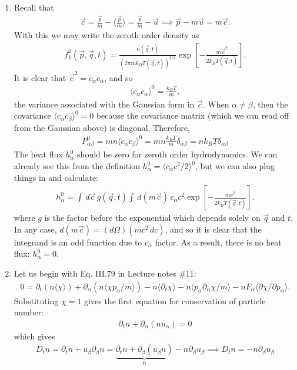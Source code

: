 \documentclass{article}
\theoremstyle{definition}
\newcommand{\p}{\partial}
\newcommand{\al}{\alpha}
\newcommand{\be}{\beta}
\newcommand{\f}[2]{\frac{#1}{#2}}
\newcommand{\lp}{\left(}
\newcommand{\rp}{\right)}
\newcommand{\lb}{\left[}
\newcommand{\rb}{\right]}
\begin{document}
\begin{enumerate}[label=(\alph*)]
	\item Recall that 
	\begin{align*}
	\vec{c} = \f{\vec{p}}{m} - \langle \f{\vec{p}}{m} \rangle = \f{\vec{p}}{m} - \vec{u} \implies \vec{p} - m\vec{u} = m\vec{c}.
	\end{align*}
	With this we may write the zeroth order density as 
	\begin{align*}
	f_1^0(\vec{p}, \vec{q}, t) = \f{n(\vec{q},t)}{(2\pi m k_BT (\vec{q},t))^{3/2}} \exp\lb -\f{m\vec{c}^2}{2k_BT(\vec{q},t)} \rb.
	\end{align*}
	It is clear that $\vec{c}^2 = c_\al c_\al$, and so 
	\begin{align*}
	\langle c_\al c_\al \rangle^0 = \f{k_B T}{m},  
	\end{align*}
	the variance associated with the Gaussian form in $\vec{c}$. When $\al \neq\be$, then the covariance $\langle c_\al c_\be \rangle^0 = 0$ because the covariance matrix (which we can read off from the Gaussian above) is diagonal. Therefore, 
	\begin{align*}
	\boxed{P^0_{\al\be}} = mn \langle c_\al c_\be\rangle^0 = mn \f{k_BT}{m} \delta_{\al\be} = \boxed{nk_B T \delta_{\al\be}}
	\end{align*}
	The heat flux $h_\al^0$ should be zero for zeroth order hydrodynamics. We can already see this from the definition $h_\al^0 = \langle c_\al c^2/2\rangle^0$, but we can also plug things in and calculate:
	\begin{align*}
	h_\al^0 = \int \,d\vec{c} \, g(\vec{q},t)\int \,d(m\vec{c}) \, c_\al c^2 \exp\lb -\f{mc^2}{2k_BT(\vec{q},t)} \rb.
	\end{align*}
	where $g$ is the factor before the exponential which depends solely on $\vec{q}$ and $t$. In any case, $d(m\vec{c}) = (d\Omega) (mc^2\, dc) $, and so it is clear that the integrand is an odd function due to $c_\al$ factor. As a result, there is no heat flux: $\boxed{h_\al^0 = 0}$.
	
	
	\item Let us begin with Eq. III.79 in Lecture notes \#11:
	\begin{align*}
	0 = \p_t (n\langle \chi \rangle ) + \p_\al \lp n\langle \chi p_\al/m \rangle  \rp - n\langle \p_t \chi \rangle - n \langle p_\al \p_\al \chi/m  \rangle - nF_\al \langle \p\chi/\p p_\al \rangle.  
	\end{align*} 
	Substituting $\chi=1$ gives the first equation for conservation of particle number:
	\begin{align*}
	\p_t n + \p_\al (n u_\al) = 0
	\end{align*}
	which gives
	\begin{align*}
	D_t n = \p_t n + u_\be \p_\be n = \underbrace{\p_t n + \p_\be (u_\be n )}_0 - n\p_\be u_\be \implies \boxed{D_t n = -n\p_\be u_\be}
	\end{align*}
	

\end{enumerate}
\end{document}
